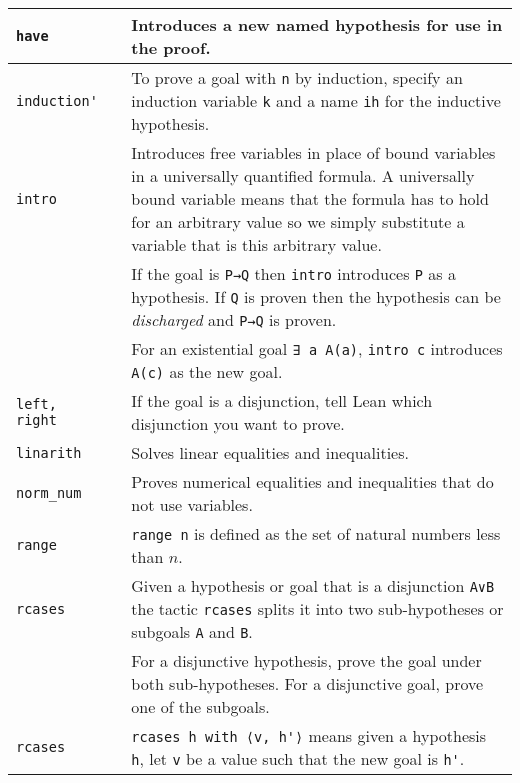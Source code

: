 \begin{tabular}{p{}|r|p{}}
\Verb+have+&\pageref{p.have}&Introduces a new named hypothesis for use in the proof.\\\hline

\Verb+induction'+&\pageref{p.induction}&To prove a goal with \Verb+n+ by induction, specify an induction variable \Verb+k+ and a name \Verb+ih+ for the inductive hypothesis.\\\hline

\Verb+intro+&\pageref{p.intro}&Introduces free variables in place of bound variables in a universally quantified formula. A universally bound variable means that the formula has to hold for an arbitrary value so we simply substitute a variable that is this arbitrary value.\\
&&If the goal is \Verb+P→Q+ then \Verb+intro+ introduces \Verb+P+ as a hypothesis. If \Verb+Q+ is proven then the hypothesis can be \emph{discharged} and \Verb+P→Q+ is proven.\\
&&For an existential goal \Verb+∃ a A(a)+, \Verb+intro c+ introduces \Verb+A(c)+ as the new goal.\\\hline

\Verb+left, right+ &\pageref{p.left-right}& If the goal is a disjunction, tell Lean which disjunction you want to prove.\\\hline

\Verb+linarith+&\pageref{p.linarith}&Solves linear equalities and inequalities.\\\hline

\Verb+norm_num+&\pageref{p.norm-num}&Proves numerical equalities and inequalities that do not use variables.\\\hline

\Verb+range+&\pageref{p.range}&\Verb+range n+ is defined as the set of natural numbers less than $n$.\\\hline

\Verb+rcases+&\pageref{p.rcases}&Given a hypothesis or goal that is a disjunction \Verb+A∨B+ the tactic \Verb+rcases+ splits it into two sub-hypotheses or subgoals \Verb+A+ and \Verb+B+.\\
&&For a disjunctive hypothesis, prove the goal under both sub-hypotheses. For a disjunctive goal, prove one of the subgoals.\\\hline

\Verb+rcases+&\pageref{p.rcases-with}&\Verb+rcases h with ⟨v, h'⟩+ means given a hypothesis \Verb+h+, let \Verb+v+ be a value such that the new goal is \Verb+h'+.\\\hline

\end{tabular}

